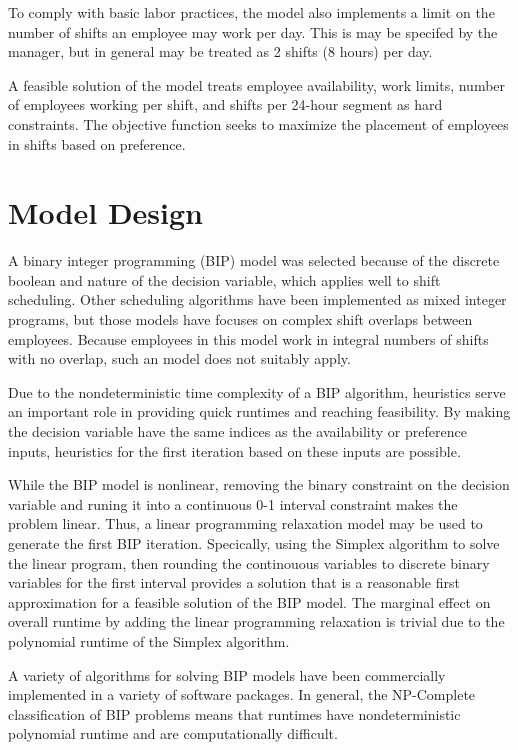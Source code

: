 To comply with basic labor practices, the model also implements a limit on the number of shifts an employee may work per day. This is may be specifed by the manager, but in general may be treated as 2 shifts (8 hours) per day. 

A feasible solution of the model treats employee availability, work limits, number of employees working per shift, and shifts per 24-hour segment as hard constraints. The objective function seeks to maximize the placement of employees in shifts based on preference.

\section{Model Design}

A binary integer programming (BIP) model was selected because of the discrete boolean and nature of the decision variable, which applies well to shift scheduling. Other scheduling algorithms have been implemented as mixed integer programs, but those models have focuses on complex shift overlaps between employees. Because employees in this model work in integral numbers of shifts with no overlap, such an model does not suitably apply.

Due to the nondeterministic time complexity of a BIP algorithm, heuristics serve an important role in providing quick runtimes and reaching feasibility. By making the decision variable have the same indices as the availability or preference inputs, heuristics for the first iteration based on these inputs are possible. 

While the BIP model is nonlinear, removing the binary constraint on the decision variable and runing it into a continuous 0-1 interval constraint makes the problem linear. Thus, a linear programming relaxation model may be used to generate the first BIP iteration. Specically, using the Simplex algorithm to solve the linear program, then rounding the continouous variables to discrete binary variables for the first interval provides a solution that is a reasonable first approximation for a feasible solution of the BIP model. The marginal effect on overall runtime by adding the linear programming relaxation is trivial due to the polynomial runtime of the Simplex algorithm.  

A variety of algorithms for solving BIP models have been commercially implemented in a variety of software packages. In general, the NP-Complete classification of BIP problems means that runtimes have nondeterministic polynomial runtime and are computationally difficult.

